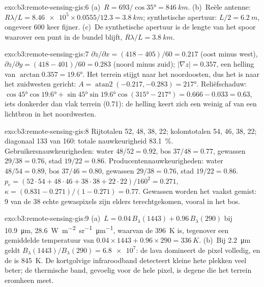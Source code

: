 \begin{solution}{exo:b3:remote-sensing-gis:6}
(a)~$R = 693/\cos\ang{35} = \qty{846}{km}$. (b)~Reële antenne: $R\lambda/L =
\num{8.46e5}\times0.0555/12.3 = \qty{3.8}{km}$; synthetische apertuur: $L/2 =
\qty{6.2}{m}$, ongeveer 600 keer fijner. (c)~De synthetische apertuur is de
lengte van het spoor waarover een punt in de bundel blijft, $R\lambda/L =
\qty{3.8}{km}$.
\end{solution}

\begin{solution}{exo:b3:remote-sensing-gis:7}
$\partial z/\partial x = (418 - 405)/60 = 0.217$ (oost minus west),
$\partial z/\partial y = (418 - 401)/60 = 0.283$ (noord minus zuid);
$|\nabla z| = 0.357$, een helling van $\arctan 0.357 = \ang{19.6}$. Het terrein
stijgt naar het noordoosten, dus het is naar het zuidwesten gericht: $A =
\operatorname{atan2}(-0.217, -0.283) = \ang{217}$. Reliëfschaduw: $\cos\ang{45}
\cos\ang{19.6} + \sin\ang{45}\sin\ang{19.6}\cos(\ang{315} - \ang{217}) =
0.666 - 0.033 = 0.63$, iets donkerder dan vlak terrein (0.71): de helling
keert zich een weinig af van een lichtbron in het noordwesten.
\end{solution}

\begin{solution}{exo:b3:remote-sensing-gis:8}
Rijtotalen 52, 48, 38, 22; kolomtotalen 54, 46, 38, 22; diagonaal 133 van
160: totale nauwkeurigheid \qty{83.1}{\percent}. Gebruikersnauwkeurigheden: water
$48/52 = 0.92$, bos $37/48 = 0.77$, gewassen $29/38 = 0.76$, stad
$19/22 = 0.86$. Producentennauwkeurigheden: water $48/54 = 0.89$, bos $37/46 = 0.80$,
gewassen $29/38 = 0.76$, stad $19/22 = 0.86$. $p_e = (52\cdot54 + 48\cdot46 +
38\cdot38 + 22\cdot22)/160^2 = 0.271$, $\kappa = (0.831 - 0.271)/(1 -
0.271) = 0.77$. Gewassen worden het vaakst gemist: 9 van de 38 echte gewaspixels
zijn elders terechtgekomen, vooral in het bos.
\end{solution}

\begin{solution}{exo:b3:remote-sensing-gis:9}
(a)~$L = 0.04\,B_\lambda(1443) + 0.96\,B_\lambda(290)$ bij
\qty{10.9}{\micro\metre}, \qty{28.6}{W.m^{-2}.sr^{-1}.\micro\metre^{-1}},
waarvan de  \qty{396}{K} is, tegenover een gemiddelde temperatuur van
$0.04\times1443 + 0.96\times290 = \qty{336}{K}$. (b)~Bij
\qty{2.2}{\micro\metre} geldt $B_\lambda(1443)/B_\lambda(290) = \num{6.8e7}$:
de lava domineert de pixel volledig, en de  is
\qty{845}{K}. De kortgolvige infraroodband detecteert kleine hete plekken
veel beter; de thermische band, gevoelig voor de hele pixel, is degene die
het terrein eromheen meet.
\end{solution}

